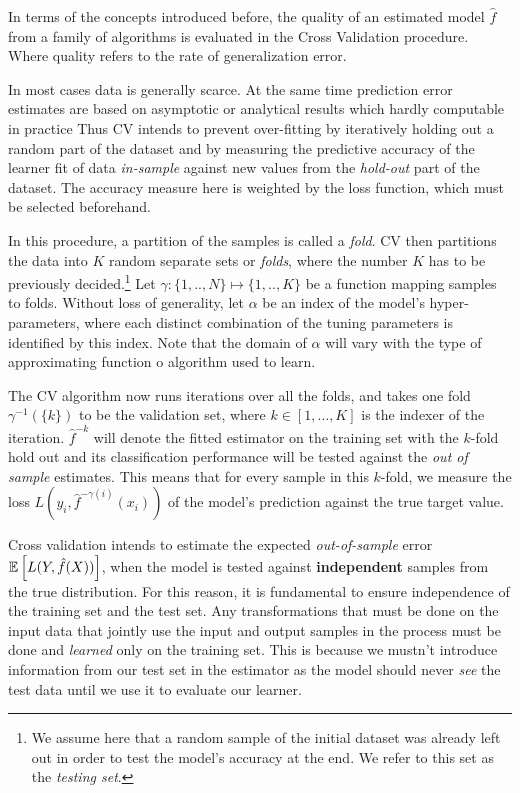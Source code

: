 In terms of the concepts introduced before, the quality of an estimated model $\hat{f}$ from a family of algorithms is evaluated in the Cross Validation procedure. Where quality refers to the rate of generalization error.

In most cases data is generally scarce. At the same time prediction error estimates are based on asymptotic or analytical results which hardly computable in practice Thus CV intends to prevent over-fitting by iteratively holding out a random part of the dataset and by measuring the predictive accuracy of the learner fit of data \textit{in-sample} against new values from the \textit{hold-out} part of the dataset. The accuracy measure here is weighted by the loss function, which must be selected beforehand.

In this procedure, a partition of the samples is called a \textit{fold}. CV then partitions the data into $K$ random separate sets or  \textit{folds}, where the number $K$ has to be previously decided.\footnote{ We assume here that a random sample of the initial dataset was already left out in order to test the model's accuracy at the end. We refer to this set as the \textit{testing set}.} Let $\gamma : \{1,..,N\} \mapsto \{1, .., K\}$ be a function mapping samples to folds. Without loss of generality, let $\alpha$ be an index of the model's hyper-parameters, where each distinct combination of the tuning parameters is identified by this index. Note that the domain of $\alpha$ will vary with the type of approximating function o algorithm used to learn.

 The CV algorithm now runs iterations over all the folds, and takes one fold $\gamma^{-1}(\{k\})$ to be the validation set, where $k \in [1,\ldots,K]$ is the indexer of the iteration. $\hat{f}^{-k}$ will denote the fitted estimator on the training set with the $k$-fold hold out and its classification performance will be tested against the \textit{out of sample} estimates. This means that for every sample in this $k$-fold, we measure the loss $L(y_i, \hat{f}^{-\gamma(i)}(x_i))$ of the model's prediction against the true target value.

Cross validation intends to estimate the expected \textit{out-of-sample} error $\operatorname{\mathbb{E}} \left[ L(Y, \hat{f}(X)) \right]$, when the model is tested against \textbf{independent} samples from the true distribution. For this reason, it is fundamental to ensure independence of the training set and the test set. Any transformations that must be done on the input data that jointly use the input and output samples in the process must be done and \textit{learned} only on the training set. This is because we mustn't introduce information from our test set in the estimator as the model should never \textit{see} the test data until we use it to evaluate our learner.

